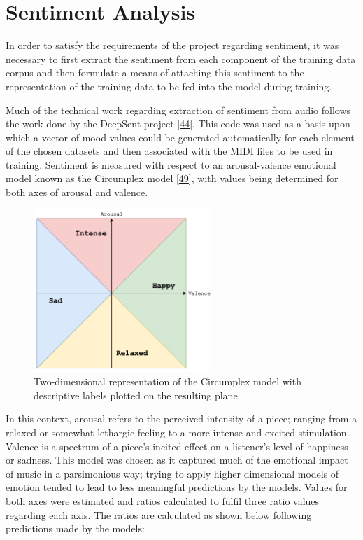 \documentclass[12pt,]{article}
\begin{document}
\hypertarget{sentiment-analysis}{%
\section{Sentiment Analysis}\label{sentiment-analysis}}

In order to satisfy the requirements of the project regarding sentiment,
it was necessary to first extract the sentiment from each component of
the training data corpus and then formulate a means of attaching this
sentiment to the representation of the training data to be fed into the
model during training.

Much of the technical work regarding extraction of sentiment from audio
follows the work done by the DeepSent project
{[}\protect\hyperlink{ref-deepsent}{44}{]}. This code was used as a
basis upon which a vector of mood values could be generated
automatically for each element of the chosen datasets and then
associated with the MIDI files to be used in training. Sentiment is
measured with respect to an arousal-valence emotional model known as the
Circumplex model
{[}\protect\hyperlink{ref-russell1980circumplex}{49}{]}, with values
being determined for both axes of arousal and valence.

\begin{figure}
\centering
\includegraphics[width=0.6\textwidth,height=\textheight]{Images/circumplex.png}
\caption{Two-dimensional representation of the Circumplex model with
descriptive labels plotted on the resulting plane.}
\end{figure}

In this context, arousal refers to the perceived intensity of a piece;
ranging from a relaxed or somewhat lethargic feeling to a more intense
and excited stimulation. Valence is a spectrum of a piece's incited
effect on a listener's level of happiness or sadness. This model was
chosen as it captured much of the emotional impact of music in a
parsimonious way; trying to apply higher dimensional models of emotion
tended to lead to less meaningful predictions by the models. Values for
both axes were estimated and ratios calculated to fulfil three ratio
values regarding each axis. The ratios are calculated as shown below
following predictions made by the models:
\end{document}
